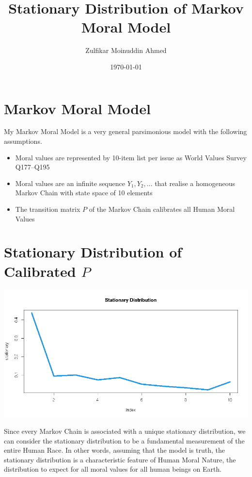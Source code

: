 \documentclass{amsart}
\title{Stationary Distribution of Markov Moral Model}
\author{Zulfikar Moinuddin Ahmed}
\date{\today}
\begin{document}
\maketitle

\section{Markov Moral Model}

My Markov Moral Model is a very general parsimonious model with the following assumptions.

\begin{itemize}
\item{Moral values are represented by 10-item list per issue as World Values Survey Q177--Q195}
\item{Moral values are an infinite sequence $Y_1,Y_2,\dots$ that realise a homogeneous Markov Chain with state space of 10 elements}
\item{The transition matrix $P$ of the Markov Chain calibrates all Human Moral Values}
\end{itemize}

\section{Stationary Distribution of Calibrated $P$}

\includegraphics[scale=0.5]{stationary.jpeg}

Since every Markov Chain is associated with a unique stationary distribution, we can consider the stationary distribution to be a fundamental measurement of the entire Human Race.  In other words, assuming that the model is truth, the stationary distribution is a characteristic feature of Human Moral Nature, the distribution to expect for all moral values for all human beings on Earth.
\end{document}
